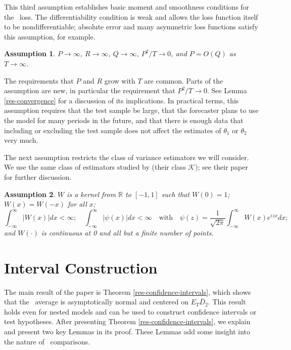 \documentclass[11pt]{article}
\newtheorem{asmp}{Assumption}
\renewcommand{\Re}{\ensuremath{\mathbb{R}}}
\begin{document}
This third assumption establishes basic moment and smoothness
conditions for the \oos\ loss.  The differentiability
condition is weak and allows the loss function itself to be
nondifferentiable; absolute error and many asymmetric loss functions
satisfy this assumption, for example.

\begin{asmp} \label{asmp-4} $P\to\infty$,
  $R\to\infty$, $Q\to\infty$, $P^2/T \to 0$, and $P = O(Q)$ as $T \to \infty$.
\end{asmp}

The requirements that $P$ and $R$ grow with $T$ are common.  Parts of
the assumption are new, in particular the requirement that $P^2/T \to
0$.  See Lemma \ref{res-convergence} for a discussion of its
implications.  In practical terms, this assumption requires that the
test sample be large, that the forecaster plans to use the model for
many periods in the future, and that there is enough data that
including or excluding the test sample does not affect the estimates
of $\theta_1$ or $\theta_2$ very much.

The next assumption restricts the class of variance estimators we will
consider.  We use the same class of estimators studied by
\citet{de_jong_consistency_2000} (their class $\mathcal{K}$); see
their paper for further discussion.

\begin{asmp}
  \label{asmp-5} $W$ is a kernel from 
$\Re$ to $[-1,1]$ such that $W(0) = 1$; $W(x) = W(-x)$ for all $x$;
\begin{equation*}
    \int_{-\infty}^{\infty} \lvert W(x) \rvert dx < \infty; \quad
    \int_{-\infty}^{\infty} \lvert \psi(x) \rvert dx < \infty \quad\text{with}\quad
    \psi(z) = \frac1{\sqrt{2\pi}} \int_{-\infty}^{\infty} W(x) e^{izx}dx;
\end{equation*}
and $W(\cdot)$ is continuous at 0 and all but a finite number of
points.
\end{asmp}

\section{Interval Construction}\label{sec:theory}
The main result of the paper is Theorem
\ref{res-confidence-intervals}, which shows that the \oos\ average is
asymptotically normal and centered on $E_T \bar D_2$.  This result
holds even for nested models and can be used to construct confidence
intervals or test hypotheses.  After presenting Theorem
\ref{res-confidence-intervals}, we explain and present two key Lemmas
in its proof.  These Lemmas add some insight into the nature of \oos\
comparisons.
\end{document}
